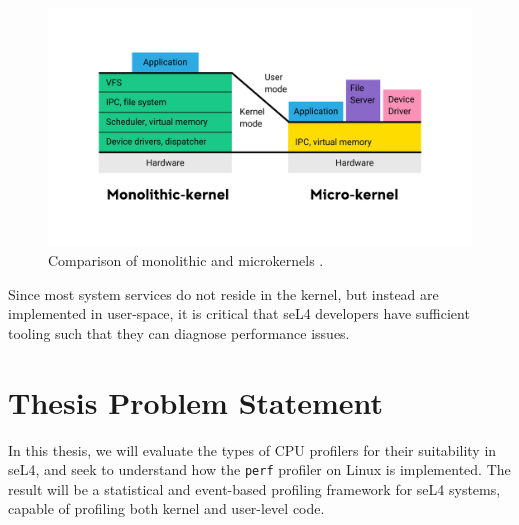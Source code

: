 \begin{figure}[h!]
    \includegraphics[width=\linewidth]{report-a_micro_v_mono}
    \caption{Comparison of monolithic and microkernels \cite{AOSMicrokernelSlide}.}
    \label{fig:sel4_microkernel}
\end{figure}

Since most system services do not reside in the kernel, but instead are implemented in user-space, it is critical that seL4 developers have sufficient tooling such that they can diagnose performance issues.

\section{Thesis Problem Statement}

In this thesis, we will evaluate the types of CPU profilers for their suitability in seL4, and seek to understand how the \texttt{perf} profiler on Linux is implemented. The result will be a statistical and event-based profiling framework for seL4 systems, capable of profiling both kernel and user-level code.